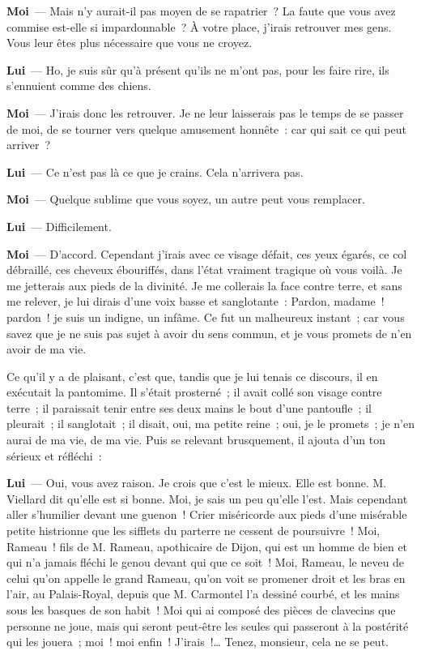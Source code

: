 \documentclass[french,twoside]{book} %
\newcommand{\labelchar}[1]{\textbf{\color{rubric} #1}}
\begin{document}
\labelchar{Moi} — Mais n’y aurait-il pas moyen de se rapatrier ? La faute que vous avez commise est-elle si impardonnable ? À votre place, j’irais retrouver mes gens. Vous leur êtes plus nécessaire que vous ne croyez.\par
\labelchar{Lui} — Ho, je suis sûr qu’à présent qu’ils ne m’ont pas, pour les faire rire, ils s’ennuient comme des chiens.\par
\labelchar{Moi} — J’irais donc les retrouver. Je ne leur laisserais pas le temps de se passer de moi, de se tourner vers quelque amusement honnête : car qui sait ce qui peut arriver ?\par
\labelchar{Lui} — Ce n’est pas là ce que je crains. Cela n’arrivera pas.\par
\labelchar{Moi} — Quelque sublime que vous soyez, un autre peut vous remplacer.\par
\labelchar{Lui} — Difficilement.\par
\labelchar{Moi} — D’accord. Cependant j’irais avec ce visage défait, ces yeux égarés, ce col débraillé, ces cheveux ébouriffés, dans l’état vraiment tragique où vous voilà. Je me jetterais aux pieds de la divinité. Je me collerais la face contre terre, et sans me relever, je lui dirais d’une voix basse et sanglotante : Pardon, madame ! pardon ! je suis un indigne, un infâme. Ce fut un malheureux instant ; car vous savez que je ne suis pas sujet à avoir du sens commun, et je vous promets de n’en avoir de ma vie.\par
Ce qu’il y a de plaisant, c’est que, tandis que je lui tenais ce discours, il en exécutait la pantomime. Il s’était prosterné ; il avait collé son visage contre terre ; il paraissait tenir entre ses deux mains le bout d’une pantoufle ; il pleurait ; il sanglotait ; il disait, oui, ma petite reine ; oui, je le promets ; je n’en aurai de ma vie, de ma vie. Puis se relevant brusquement, il ajouta d’un ton sérieux et réfléchi :\par
\labelchar{Lui} — Oui, vous avez raison. Je crois que c’est le mieux. Elle est bonne. M. Viellard dit qu’elle est si bonne. Moi, je sais un peu qu’elle l’est. Mais cependant aller s’humilier devant une guenon ! Crier miséricorde aux pieds d’une misérable petite histrionne que les sifflets du parterre ne cessent de poursuivre ! Moi, Rameau ! fils de M. Rameau, apothicaire de Dijon, qui est un homme de bien et qui n’a jamais fléchi le genou devant qui que ce soit ! Moi, Rameau, le neveu de celui qu’on appelle le grand Rameau, qu’on voit se promener droit et les bras en l’air, au Palais-Royal, depuis que M. Carmontel l’a dessiné courbé, et les mains sous les basques de son habit ! Moi qui ai composé des pièces de clavecins que personne ne joue, mais qui seront peut-être les seules qui passeront à la postérité qui les jouera ; moi ! moi enfin ! J’irais !… Tenez, monsieur, cela ne se peut.\par
\end{document}
